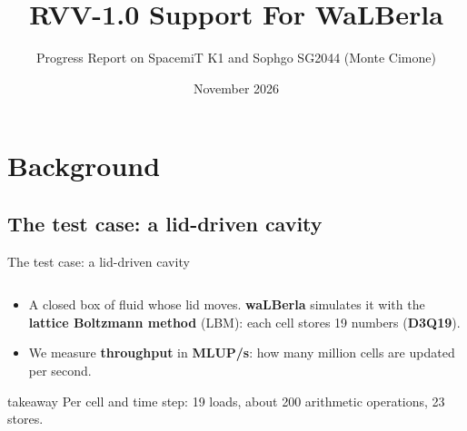 \documentclass[aspectratio=169,10pt,t]{beamer}
\title{RVV-1.0 Support For WaLBerla}
\subtitle{Progress Report on SpacemiT K1 and Sophgo SG2044 (Monte Cimone)}
\author{\presenter}
\date{November 2026}
\newcommand{\term}[1]{\textcolor{psblue!85!black}{\textbf{#1}}} %
\newcommand{\takeaway}[1]{\par\vfill
  \begin{beamercolorbox}[wd=\textwidth,sep=4pt,rounded=true]{takeaway}
    \small #1
  \end{beamercolorbox}}
\begin{document}
\begin{frame}[plain]
\end{frame}

\section{Background}
\subsection{The test case: a lid-driven cavity}

\begin{frame}{The test case: a lid-driven cavity}
  \vspace{1mm}
  \begin{columns}[T,onlytextwidth]
    \centering
    \centering\resizebox{!}{4.1cm}{}
  \end{columns}
  \vspace{1mm}
  \begin{itemize}\small
    \item A closed box of fluid whose lid moves. \term{waLBerla} simulates it with the \term{lattice Boltzmann
          method} (LBM): each cell stores 19 numbers (\term{D3Q19}).
    \item We measure \term{throughput} in \term{MLUP/s}: how many million cells are updated per second.
  \end{itemize}
  \takeaway{Per cell and time step: 19 loads, about 200 arithmetic operations, 23 stores.}
\end{frame}
\end{document}

